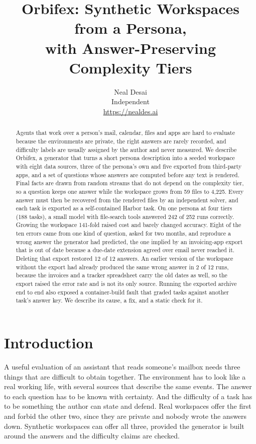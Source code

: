\documentclass{article}
\title{Orbifex: Synthetic Workspaces from a Persona,\\ with Answer-Preserving Complexity Tiers}
\author{%
  Neal Desai \\
  Independent \\
  \url{https://nealdes.ai}
}
\begin{document}
\maketitle

\begin{abstract}
Agents that work over a person's mail, calendar, files and apps are hard to evaluate because the environments are private, the right answers are rarely recorded, and difficulty labels are usually assigned by the author and never measured. We describe Orbifex, a generator that turns a short persona description into a seeded workspace with eight data sources, three of the persona's own and five exported from third-party apps, and a set of questions whose answers are computed before any text is rendered. Final facts are drawn from random streams that do not depend on the complexity tier, so a question keeps one answer while the workspace grows from 59 files to 4{,}225. Every answer must then be recovered from the rendered files by an independent solver, and each task is exported as a self-contained Harbor task. On one persona at four tiers (188 tasks), a small model with file-search tools answered 242 of 252 runs correctly. Growing the workspace 141-fold raised cost and barely changed accuracy. Eight of the ten errors came from one kind of question, asked for two months, and reproduce a wrong answer the generator had predicted, the one implied by an invoicing-app export that is out of date because a due-date extension agreed over email never reached it. Deleting that export restored 12 of 12 answers. An earlier version of the workspace without the export had already produced the same wrong answer in 2 of 12 runs, because the invoices and a tracker spreadsheet carry the old dates as well, so the export raised the error rate and is not its only source. Running the exported archive end to end also exposed a container-build fault that graded tasks against another task's answer key. We describe its cause, a fix, and a static check for it.
\end{abstract}

\section{Introduction}

A useful evaluation of an assistant that reads someone's mailbox needs three things that are difficult to obtain together. The environment has to look like a real working life, with several sources that describe the same events. The answer to each question has to be known with certainty. And the difficulty of a task has to be something the author can state and defend. Real workspaces offer the first and forbid the other two, since they are private and nobody wrote the answers down. Synthetic workspaces can offer all three, provided the generator is built around the answers and the difficulty claims are checked.
\end{document}
